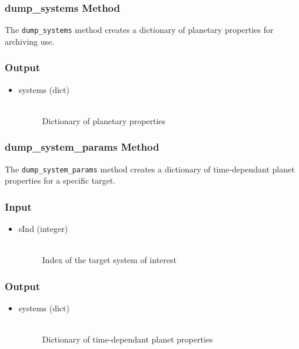 \documentclass[cleanfoot]{asme2ej}
\begin{document}
\subsubsection{dump\_systems Method} \label{sec:dumpsystemstask}
The \verb+dump_systems+ method creates a dictionary of planetary properties for archiving use.

\subsubsection*{Output}
\begin{itemize}
\item 
\begin{description}
    \item[systems (dict)] \hfill \\ Dictionary of planetary properties
\end{description}
\end{itemize}

\subsubsection{dump\_system\_params Method} \label{sec:dumpsystemparamstask}
The \verb+dump_system_params+ method creates a dictionary of time-dependant planet properties for a specific target.

\subsubsection*{Input}
\begin{itemize}
\item 
\begin{description}
    \item[sInd (integer)] \hfill \\ Index of the target system of interest
\end{description}
\end{itemize}

\subsubsection*{Output}
\begin{itemize}
\item 
\begin{description}
    \item[systems (dict)] \hfill \\ Dictionary of time-dependant planet properties
\end{description}
\end{itemize}
\end{document}
